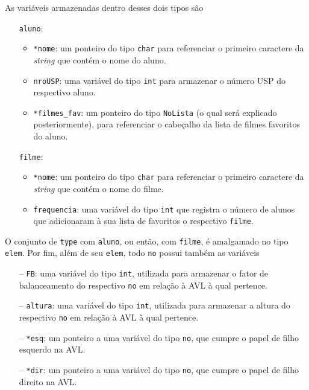 \documentclass[12pt,a4paper,portuguese]{article}
\begin{document}
        As variáveis armazenadas dentro desses dois tipos são
        \begin{itemize}
            \item[]\verb|aluno|:
            \begin{itemize}
                \item\verb|*nome|: um ponteiro do tipo \verb|char| para referenciar o primeiro caractere da \textit{string} que contém o nome do aluno.
                \item\verb|nroUSP|: uma variável do tipo \verb|int| para armazenar o número USP do respectivo aluno.
                \item\verb|*filmes_fav|: um ponteiro do tipo \verb|NoLista| (o qual será explicado posteriormente), para referenciar o cabeçalho da lista de filmes favoritos do aluno.
            \end{itemize}
            \item[]\verb|filme|:
            \begin{itemize}
                \item\verb|*nome|: um ponteiro do tipo \verb|char| para referenciar o primeiro caractere da \textit{string} que contém o nome do filme.
                \item\verb|frequencia|: uma variável do tipo \verb|int| que registra o número de alunos que adicionaram à sua lista de favoritos o respectivo \verb|filme|.
            \end{itemize}
        \end{itemize}
        O conjunto de \verb|type| com \verb|aluno|, ou então, com \verb|filme|, é amalgamado no tipo \verb|elem|. Por fim, além de seu \verb|elem|, todo \verb|no| possui também as variáveis
        \begin{itemize}
            \item[--]\verb|FB|: uma variável do tipo \verb|int|, utilizada para armazenar o fator de balanceamento do respectivo \verb|no| em relação à AVL à qual pertence.
            \item[--]\verb|altura|: uma variável do tipo \verb|int|, utilizada para armazenar a altura do respectivo \verb|no| em relação à AVL à qual pertence.
            \item[--]\verb|*esq|: um ponteiro a uma variável do tipo \verb|no|, que cumpre o papel de filho esquerdo na AVL.
            \item[--]\verb|*dir|: um ponteiro a uma variável do tipo \verb|no|, que cumpre o papel de filho direito na AVL.
        \end{itemize}
\end{document}
